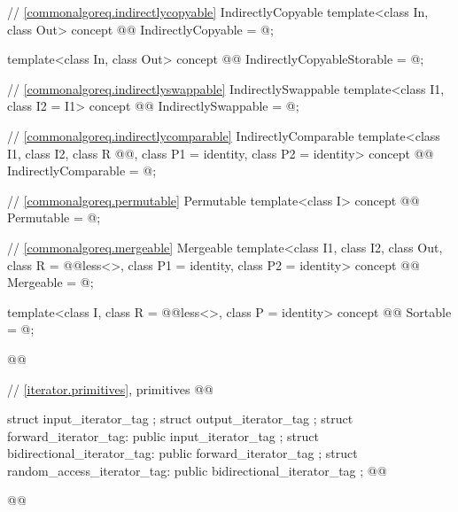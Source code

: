 \begin{addedblock}
\begin{codeblock}
  // \ref{commonalgoreq.indirectlycopyable} IndirectlyCopyable
  template<class In, class Out>
  concept @@ IndirectlyCopyable = @\seebelownc@;

  template<class In, class Out>
  concept @@ IndirectlyCopyableStorable = @\seebelownc@;

  // \ref{commonalgoreq.indirectlyswappable} IndirectlySwappable
  template<class I1, class I2 = I1>
  concept @@ IndirectlySwappable = @\seebelownc@;

  // \ref{commonalgoreq.indirectlycomparable} IndirectlyComparable
  template<class I1, class I2, class R @@, class P1 = identity,
      class P2 = identity>
  concept @@ IndirectlyComparable = @\seebelownc@;

  // \ref{commonalgoreq.permutable} Permutable
  template<class I>
  concept @@ Permutable = @\seebelownc@;

  // \ref{commonalgoreq.mergeable} Mergeable
  template<class I1, class I2, class Out,
      class R = @@less<>, class P1 = identity, class P2 = identity>
  concept @@ Mergeable = @\seebelownc@;

  template<class I, class R = @@less<>, class P = identity>
  concept @@ Sortable = @\seebelownc@;

  @@

  // \ref{iterator.primitives}, primitives
  @@\end{codeblock}\end{addedblock}\begin{codeblock}
  struct input_iterator_tag { };
  struct output_iterator_tag { };
  struct forward_iterator_tag: public input_iterator_tag { };
  struct bidirectional_iterator_tag: public forward_iterator_tag { };
  struct random_access_iterator_tag: public bidirectional_iterator_tag { };
  @@

  @@


\end{codeblock}

